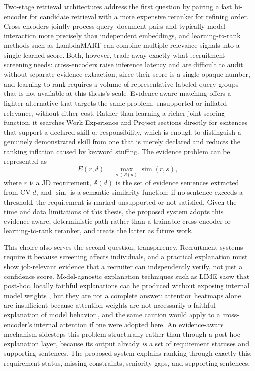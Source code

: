 \documentclass[12pt,a4paper,oneside]{report}
\begin{document}
Two-stage retrieval architectures address the first question by pairing a fast bi-encoder for candidate retrieval with a more expensive reranker for refining order. Cross-encoders jointly process query--document pairs and typically model interaction more precisely than independent embeddings, and learning-to-rank methods such as LambdaMART can combine multiple relevance signals into a single learned score. Both, however, trade away exactly what recruitment screening needs: cross-encoders raise inference latency and are difficult to audit without separate evidence extraction, since their score is a single opaque number, and learning-to-rank requires a volume of representative labeled query groups that is not available at this thesis's scale. Evidence-aware matching offers a lighter alternative that targets the same problem, unsupported or inflated relevance, without either cost. Rather than learning a richer joint scoring function, it searches Work Experience and Project sections directly for sentences that support a declared skill or responsibility, which is enough to distinguish a genuinely demonstrated skill from one that is merely declared and reduces the ranking inflation caused by keyword stuffing. The evidence problem can be represented as
\begin{equation}
E(r,d)=\max_{s\in \mathcal{S}(d)} \operatorname{sim}(r,s),
\end{equation}
where $r$ is a JD requirement, $\mathcal{S}(d)$ is the set of evidence sentences extracted from CV $d$, and $\operatorname{sim}$ is a semantic similarity function; if no sentence exceeds a threshold, the requirement is marked unsupported or not satisfied. Given the time and data limitations of this thesis, the proposed system adopts this evidence-aware, deterministic path rather than a trainable cross-encoder or learning-to-rank reranker, and treats the latter as future work.

This choice also serves the second question, transparency. Recruitment systems require it because screening affects individuals, and a practical explanation must show job-relevant evidence that a recruiter can independently verify, not just a confidence score. Model-agnostic explanation techniques such as LIME show that post-hoc, locally faithful explanations can be produced without exposing internal model weights \citep{ribeiro2016}, but they are not a complete answer: attention heatmaps alone are insufficient because attention weights are not necessarily a faithful explanation of model behavior \citep{jacovi2020}, and the same caution would apply to a cross-encoder's internal attention if one were adopted here. An evidence-aware mechanism sidesteps this problem structurally rather than through a post-hoc explanation layer, because its output already \emph{is} a set of requirement statuses and supporting sentences. The proposed system explains ranking through exactly this: requirement status, missing constraints, seniority gaps, and supporting sentences.
\end{document}
